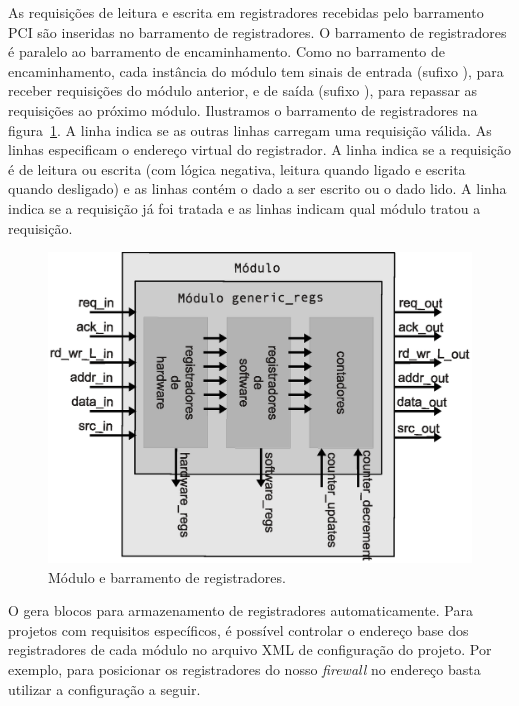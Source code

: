As requisições de leitura e escrita em registradores recebidas pelo
barramento PCI são inseridas no barramento de registradores.  O
barramento de registradores é paralelo ao barramento de encaminhamento.
Como no barramento de encaminhamento, cada instância do módulo
 tem sinais de entrada (sufixo ), para
receber requisições do módulo anterior, e de saída (sufixo ),
para repassar as requisições ao próximo módulo.  Ilustramos o barramento
de registradores na figura~\ref{fig:impl.regs.bus}.  A linha 
indica se as outras linhas carregam uma requisição válida.  As linhas
 especificam o endereço virtual do registrador.  A linha
 indica se a requisição é de leitura ou escrita (com
lógica negativa, leitura quando ligado e escrita quando desligado) e as
linhas  contém o dado a ser escrito ou o dado lido.  A linha
 indica se a requisição já foi tratada e as linhas 
indicam qual módulo tratou a requisição.

\begin{figure}
\centering
\includegraphics[scale=0.6,angle=0]{figures/modulos/genregister.eps}
\caption{Módulo  e barramento de registradores.}
\label{fig:impl.regs.bus}
\end{figure}

O  gera blocos para armazenamento de
registradores automaticamente.  Para projetos com requisitos
específicos, é possível controlar o endereço base dos registradores de
cada módulo no arquivo XML de configuração do projeto.  Por exemplo,
para posicionar os registradores do nosso \emph{firewall} no endereço
 basta utilizar a configuração a seguir.

